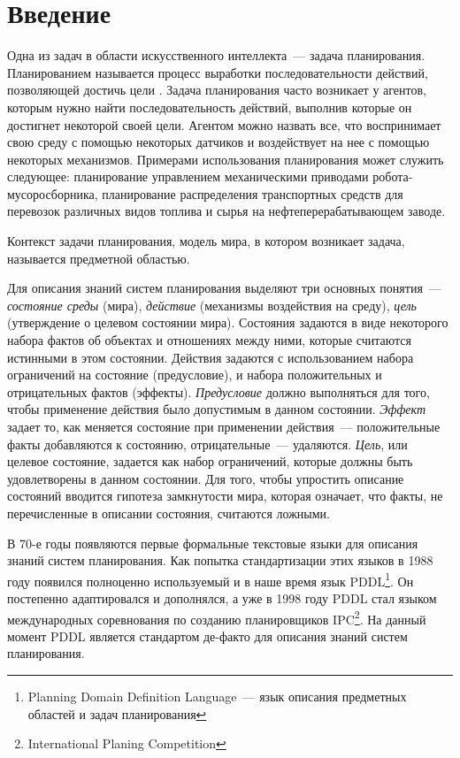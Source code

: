 \chapter*{Введение}

    Одна из задач в области искусственного интеллекта~--- задача планирования.
 Планированием называется процесс выработки последовательности действий, позволяющей достичь цели \cite{norwig-ai}.
 Задача планирования часто возникает у агентов, которым нужно найти последовательность действий, выполнив которые он достигнет некоторой своей цели.
 Агентом можно назвать все, что воспринимает свою среду с помощью некоторых датчиков и воздействует на нее с помощью некоторых механизмов.
 Примерами использования планирования может служить следующее: планирование управлением механическими приводами робота-мусоросборника, планирование распределения транспортных средств для перевозок различных видов топлива и сырья на нефтеперерабатывающем заводе.
 
    Контекст задачи планирования, модель мира, в котором возникает задача,  называется предметной областью.
    
 Для описания знаний систем планирования выделяют три основных понятия~--- \textit{состояние среды} (мира), \textit{действие} (механизмы воздействия на среду), \textit{цель} (утверждение о целевом состоянии мира).
 Состояния задаются в виде некоторого набора фактов об объектах и отношениях между ними, которые считаются истинными в этом состоянии.
 Действия задаются с использованием набора ограничений на состояние (предусловие), и набора положительных и отрицательных фактов (эффекты).
 \textit{Предусловие} должно выполняться для того, чтобы применение действия было допустимым в данном состоянии.
 \textit{Эффект} задает то, как меняется состояние при применении действия~--- положительные факты добавляются к состоянию, отрицательные~--- удаляются.
 \textit{Цель}, или целевое состояние, задается как набор ограничений, которые должны быть удовлетворены в данном состоянии.
 Для того, чтобы упростить описание состояний вводится гипотеза замкнутости мира, которая означает, что факты, не перечисленные в описании состояния, считаются ложными.
    
В 70-е годы появляются первые формальные текстовые языки для описания знаний систем планирования. Как попытка стандартизации этих языков в 1988 году появился полноценно используемый и в наше время язык PDDL\footnote{Planning Domain Definition Language~--- язык описания предметных областей и задач планирования}\cite{pddl3}. Он постепенно адаптировался и дополнялся, а уже в 1998 году PDDL стал языком международных соревнования по созданию планировщиков IPC\footnote{International Planing Competition}. 
На данный момент PDDL является стандартом де-факто для описания знаний систем планирования.

